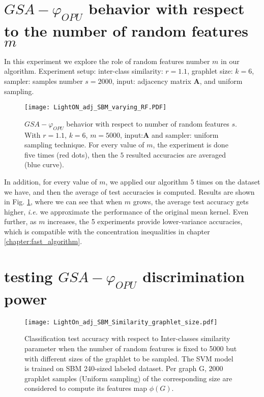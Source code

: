 \section{$GSA-\varphi_{OPU}$ behavior with respect to the number of random features $m$}
In this experiment we explore the role of random features number $m$ in our algorithm. 
Experiment setup: inter-class similarity: $r=1.1$, graphlet size: $k=6$, sampler: samples number $s=2000$, input: adjacency matrix $\mathbf{A}$, and uniform sampling.
\begin{figure}[H]
\centering
\texttt{[image: LightON\_adj\_SBM\_varying\_RF.PDF]}
\caption[$GSA-\varphi_{OPU}$ behavior with respect to number of random features $m$]{$GSA-\varphi_{OPU}$ behavior with respect to number of random features $s$. With  $r=1.1$, $k=6$, $m=5000$, input:$\mathbf{A}$ and sampler: uniform sampling technique. For every value of $m$, the experiment is done five times (red dots), then the $5$ resulted accuracies are averaged (blue curve).}
\label{fig:varying_random_features}
\end{figure}
In addition, for every value of $m$, we applied our algorithm $5$ times on the dataset we have, and then the average of test accuracies is computed. Results are shown in Fig. \ref{fig:varying_random_features}, where we can  see that when $m$ grows, the average test accuracy gets higher, \emph{i.e.} we approximate the performance of the original mean kernel. Even further, as $m$ increases, the 5 experiments provide lower-variance accuracies, which is compatible with the concentration inequalities in chapter \ref{chapter:fast_algorithm}.

\section{testing $GSA-\varphi_{OPU}$ discrimination power}
\begin{figure}[H]
\centering
\texttt{[image: LightOn\_adj\_SBM\_Similarity\_graphlet\_size.pdf]}

\caption[Classification test accuracy as a function of Inter-classes similarity parameter ]{Classification test accuracy with respect to Inter-classes similarity parameter when the number of random features is fixed to 5000 but with different sizes of the graphlet to be sampled. The SVM model is trained on SBM 240-sized labeled dataset. Per graph G, 2000 graphlet samples (Uniform sampling) of the corresponding size are considered to compute its features map $\phi(G)$.}
\label{fig:LightOn_adj_SBM_mult_factor}
\end{figure}


